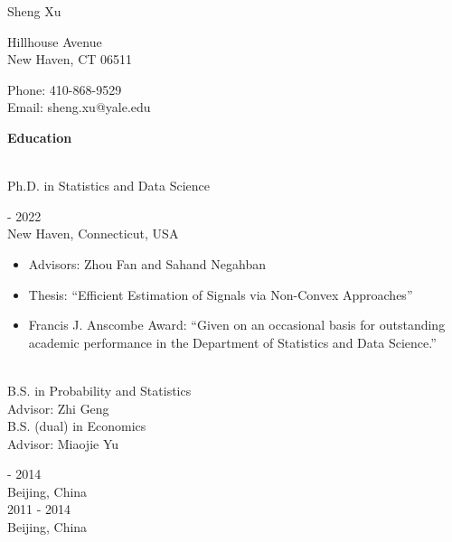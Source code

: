 \documentclass{article}
\begin{document}
\begin{Huge}
\noindent Sheng Xu
\end{Huge}

\vspace{5mm}
\begin{minipage}{0.7\linewidth}
  \flushleft
{} Hillhouse Avenue \\
\noindent New Haven, CT 06511
\end{minipage}
\hfill
\begin{minipage}{0.29\linewidth}
  Phone: 410-868-9529 \\
  Email: sheng.xu@yale.edu
\end{minipage}

\vspace{5mm}
\begin{large}
\noindent \textbf{Education}
\end{large}
\vspace{5mm}


\begin{minipage}{0.65\linewidth}
\\
Ph.D. in Statistics and Data Science\\
\end{minipage}\hfill
\begin{minipage}{0.34\linewidth}
 - 2022\\
New Haven, Connecticut, USA\\
\end{minipage}
\vspace{-6mm}
\begin{itemize}
\setlength{\itemsep}{-0.5mm}
\item[\raisebox{0.25ex}{\tiny$\bullet$}] Advisors: Zhou Fan and Sahand Negahban
\item[\raisebox{0.25ex}{\tiny$\bullet$}] Thesis: ``Efficient Estimation of Signals via Non-Convex Approaches''
\item[\raisebox{0.25ex}{\tiny$\bullet$}] Francis J. Anscombe Award: “Given on an occasional basis for outstanding academic performance in the Department of Statistics and Data Science.”
\end{itemize}

\begin{minipage}{0.65\linewidth}
\\
B.S. in Probability and Statistics\\
Advisor: Zhi Geng\\
B.S. (dual) in Economics\\
Advisor: Miaojie Yu\\
\end{minipage}\hfill
\begin{minipage}{0.34\linewidth}
 - 2014\\
Beijing, China\\
2011 - 2014\\
Beijing, China\\
\end{minipage}
\end{document}
